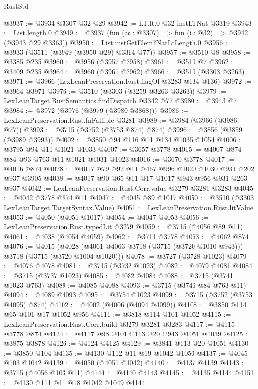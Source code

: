 \begin{lexlean}{RustStd}
\begin{coremodule}
@3937 := @3934 @3307 @32 @29
@3942 := LT.lt.{0} @32 instLTNat @3319
@3943 := List.length.{0}
@3949 := @3937 (fun (as : @3307) => fun (i : @32) => @3942 (@3943 @29 @3363))
@3950 := List.instGetElem?NatLtLength.{0}
@3956 := @3933 (@3511 (@3949 (@3950 @29) @3314 @77))
@3957 := @3510 @8
@3958 := @3385 @235
@3960 := @3956 (@3957 @3958)
@3961 := @3510 @7
@3962 := @3409 @235
@3964 := @3960 (@3961 @3962)
@3966 := @3510 (@3303 @3263)
@3971 := @3966 (LexLeanPreservation.Rust.flagOf @3283 @134 @136)
@3972 := @3964 @3971
@3976 := @3510 (@3303 (@3259 @3263 @3263))
@3979 := LexLeanTarget.RustSemantics.findDispatch @3342 @77
@3980 := @3943 @7
@3984 := @3972 (@3976 (@3979 (@3980 @3868)))
@3986 := LexLeanPreservation.Rust.fnFallible @3281
@3989 := @3984 (@3966 (@3986 @77))
@3993 := @3715 (@3752 (@3753 @874) @874)
@3996 := @3856 (@3859 (@3989 @3993))
@4002 := @3850 @94 @116 @11 @134 @1035 @1054
@4006 := @3795 @94 @11 @1021 @1033
@4007 := @3657 @3778
@4015 := @4007 @874 @84 @93 @763 @11 @1021 @1031 @1023
@4016 := @3670 @3778
@4017 := @4016 @874
@4028 := @4017 @79 @92 @11 @467 @996 @1020 @1030 @931 @202 @937 @3905
@4038 := @4017 @90 @65 @11 @17 @1017 @943 @956 @931 @263 @937
@4042 := LexLeanPreservation.Rust.Corr.value @3279 @3281 @3283
@4045 := @4042 @3778 @874 @11
@4047 := @4045 @89 @1017
@4050 := @3510 (@3303 LexLeanTarget.TargetSyntax.Value)
@4051 := LexLeanPreservation.Rust.litValue
@4053 := @4050 (@4051 @1017)
@4054 := @4047 @4053
@4056 := LexLeanPreservation.Rust.typedLit @3279
@4059 := @3715 (@4056 @89 @11)
@4061 := @4038 (@4054 @4059)
@4062 := @3711 @3778
@4063 := @4062 @874
@4076 := @4015
    (@4028 (@4061 @4063 @3718 (@3715 (@3720 @1010 @943))) @3718 (@3715 (@3720 @1004 @1020)))
@4078 := @3727 (@3728 @1023)
@4079 := @4076 @4078
@4081 := @3715 (@3732 @1023)
@4082 := @4079 @4081
@4084 := @3715 (@3737 @1023)
@4085 := @4082 @4084
@4088 := @3715 (@3741 @1023 @763)
@4089 := @4085 @4088
@4093 := @3715 (@3746 @84 @763 @11)
@4094 := @4089 @4093
@4095 := @3754 @1023
@4099 := @3715 (@3752 (@3753 @4095) @874)
@4102 := @4002 (@4006 (@4094 @4099))
@4108 := @3850 @114 @65 @101 @17 @1052 @956
@4111 := @3818 @114 @101 @1052
@4115 := LexLeanPreservation.Rust.Corr.build @3279 @3281 @3283
@4117 := @4115 @3778 @874
@4124 := @4117 @98 @101 @113 @20 @943 @1051 @1039
@4125 := @3875 @3878
@4126 := @4124 @4125
@4129 := @3841 @113 @20 @1051
@4130 := @3850 @104
@4135 := @4130 @112 @11 @19 @1042 @1050
@4137 := @4045 @103 @1042
@4139 := @4050 (@4051 @1042)
@4140 := @4137 @4139
@4143 := @3715 (@4056 @103 @11)
@4144 := @4140 @4143
@4145 := @4135 @4144
@4151 := @4130 @111 @11 @18 @1042 @1049 @4144

\end{coremodule}
\end{lexlean}
